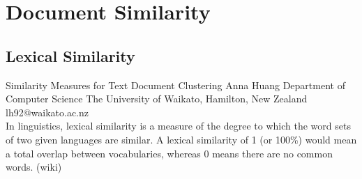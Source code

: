 
\chapter{Document Similarity} %

\label{Chapter 3} %



\section{Lexical Similarity}
Similarity Measures for Text Document Clustering
                  Anna Huang
       Department of Computer Science
The University of Waikato, Hamilton, New Zealand
             lh92@waikato.ac.nz\\

In linguistics, lexical similarity is a measure of the degree to which the word sets of two given languages  are similar. A lexical similarity of 1 (or 100\%) would mean a total overlap between vocabularies, whereas 0 means there are no common words. (wiki)\\


